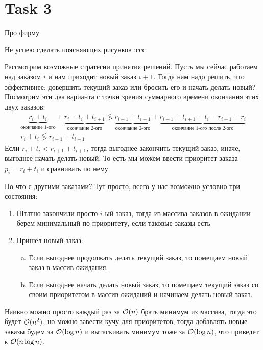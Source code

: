 \section{Task 3}
\begin{task}
    Про фирму
\end{task}

\begin{solution}
    \begin{remark}
        Не успею сделать поясняющих рисунков :ссс
    \end{remark}

    Рассмотрим возможные стратегии принятия решений. Пусть мы сейчас работаем над заказом $i$ и нам приходит новый заказ $i+1$. Тогда нам надо решить, что эффективнее: довершить текущий заказ или бросить его и начать делать новый? Посмотрим эти два варианта с точки зрения суммарного времени окончания этих двух заказов:
    \begin{gather}
        \label{eq:times}
        \underbrace{r_i + t_i}_{\text{окончание 1-ого}} + \underbrace{r_i + t_i + t_{i+1}}_{\text{окончание 2-ого}} \lessgtr \underbrace{r_{i+1} + t_{i+1}}_{\text{окончание 2-ого}} + \underbrace{r_{i+1} + t_{i+1} + t_{i} - r_{i+1} + r_i}_{\text{окончание 1-ого после 2-ого}} \\
        r_i + t_i \lessgtr r_{i+1} + t_{i+1}
    \end{gather}
    Если $r_i + t_i < r_{i+1} + t_{i+1}$, тогда выгоднее закончить текущий заказ, иначе, выгоднее начать делать новый. То есть мы можем ввести приоритет заказа $p_i = r_i + t_i$ и сравнивать по нему.

    Но что с другими заказами? Тут просто, всего у нас возможно условно три состояния:
    \begin{enumerate}[1)]
        \item Штатно закончили просто $i$-ый заказ, тогда из массива заказов в ожидании берем минимальный по приоритету, если таковые заказы есть
        \item Пришел новый заказ:
        \begin{enumerate}[a)]
            \item Если выгоднее продолжать делать текущий заказ, то помещаем новый заказ в массив ожидания.
            \item Если выгоднее начать делать новый заказ, то помещаем текущий заказ со своим приоритетом в массив ожиданий и начинаем делать новый заказ.
        \end{enumerate}
    \end{enumerate}
    Наивно можно просто каждый раз за $\mathcal{O}(n)$ брать минимум из массива, тогда это будет $\mathcal{O}(n^2)$, но можно завести кучу для приоритетов, тогда добавлять новые заказы будем за $\mathcal{O}(\log n)$ и вытаскивать минимум тоже за $\mathcal{O}(\log n)$, что приведет к $\mathcal{O}(n\log n)$.
\end{solution}
